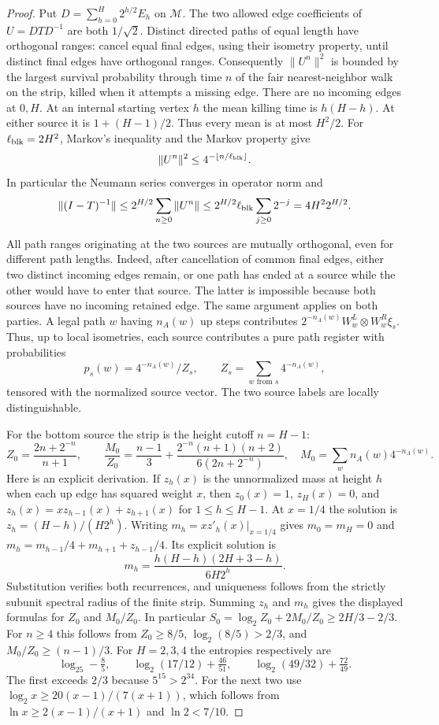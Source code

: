 \begin{proof}
Put $D=\sum_{h=0}^H2^{h/2}E_h$ on $\mathcal M$. The two allowed edge
coefficients of $U=DTD^{-1}$ are both $1/\sqrt2$. Distinct directed paths
of equal length have orthogonal ranges: cancel equal final edges, using
their isometry property, until distinct final edges have orthogonal ranges.
Consequently $\|U^n\|^2$ is bounded by the largest survival probability
through time $n$ of the fair nearest-neighbor walk on the strip, killed
when it attempts a missing edge. There are no incoming edges at $0,H$.
At an internal starting vertex $h$ the mean killing time is $h(H-h)$.
At either source it is $1+(H-1)/2$. Thus every mean is at most $H^2/2$.
For $\ell_{\rm blk}=2H^2$, Markov's inequality and the Markov property give
\[
 \|U^n\|^2\le4^{-\lfloor n/\ell_{\rm blk}\rfloor}.
\]
In particular the Neumann series converges in operator norm and
\[
 \|(I-T)^{-1}\|
 \le 2^{H/2}\sum_{n\ge0}\|U^n\|
 \le 2^{H/2}\ell_{\rm blk}\sum_{j\ge0}2^{-j}=4H^2 2^{H/2}.
\]

All path ranges originating at the two sources are mutually orthogonal,
even for different path lengths. Indeed, after cancellation of common
final edges, either two distinct incoming edges remain, or one path has
ended at a source while the other would have to enter that source. The
latter is impossible because both sources have no incoming retained edge.
The same argument applies on both parties. A legal path $w$ having
$n_A(w)$ up steps contributes $2^{-n_A(w)}W_w^L\otimes W_w^R\xi_s$.
Thus, up to local isometries, each source contributes a pure path register
with probabilities
\[
 p_s(w)=4^{-n_A(w)}/Z_s,
 \qquad Z_s=\sum_{w\text{ from }s}4^{-n_A(w)},
\]
tensored with the normalized source vector. The two source labels are
locally distinguishable.

For the bottom source the strip is the height cutoff $n=H-1$:
\[
 Z_0=\frac{2n+2^{-n}}{n+1},\qquad
 \frac{M_0}{Z_0}=\frac{n-1}{3}
 +\frac{2^{-n}(n+1)(n+2)}{6(2n+2^{-n})},
 \quad M_0=\sum_w n_A(w)4^{-n_A(w)}.
\]
Here is an explicit derivation. If $z_h(x)$ is the unnormalized mass at
height $h$ when each up edge has squared weight $x$, then
$z_0(x)=1$, $z_H(x)=0$, and
$z_h(x)=xz_{h-1}(x)+z_{h+1}(x)$ for $1\le h\le H-1$.
At $x=1/4$ the solution is $z_h=(H-h)/(H2^h)$.
Writing $m_h=xz'_h(x)|_{x=1/4}$ gives $m_0=m_H=0$ and
$m_h=m_{h-1}/4+m_{h+1}+z_{h-1}/4$. Its explicit solution is
\[
 m_h=\frac{h(H-h)(2H+3-h)}{6H2^h}.
\]
Substitution verifies both recurrences, and uniqueness follows from the
strictly subunit spectral radius of the finite strip. Summing $z_h$ and
$m_h$ gives the displayed formulas for $Z_0$ and $M_0/Z_0$. In particular
$S_0=\log_2Z_0+2M_0/Z_0\ge2H/3-2/3$. For $n\ge4$ this follows from
$Z_0\ge8/5$, $\log_2(8/5)>2/3$, and $M_0/Z_0\ge(n-1)/3$.
For $H=2,3,4$ the entropies respectively are
\[
 \log_25-\tfrac85,\qquad
 \log_2(17/12)+\tfrac{46}{51},\qquad
 \log_2(49/32)+\tfrac{72}{49}.
\]
The first exceeds $2/3$ because $5^{15}>2^{34}$. For the next two use
$\log_2x\ge20(x-1)/(7(x+1))$, which follows from
$\ln x\ge2(x-1)/(x+1)$ and $\ln2<7/10$.


\end{proof}
